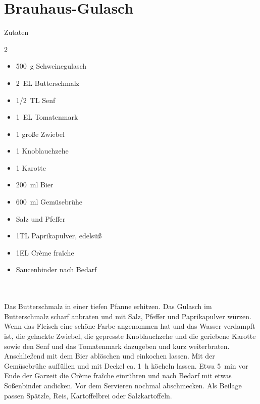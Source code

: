 \section*{Brauhaus-Gulasch}
\ihead{}\ohead{}
\cfoot{}
{\Large Zutaten}
\begin{multicols}{2}
\begin{itemize}
\item \SI{500}{g} Schweinegulasch
\item \SI{2}{EL} Butterschmalz
\item \SI{1/2}{TL} Senf
\item \SI{1}{EL} Tomatenmark
\item \num{1} große Zwiebel
\item \num{1} Knoblauchzehe
\item \num{1} Karotte
\item \SI{200}{ml} Bier
\item \SI{600}{ml} Gemüsebrühe
\item Salz und Pfeffer
\item \num{1}{TL} Paprikapulver, edelsüß
\item \num{1}{EL} Crème fraîche
\item Saucenbinder nach Bedarf
\end{itemize}
\end{multicols}
\\
\\
Das Butterschmalz in einer tiefen Pfanne erhitzen.
Das Gulasch im Butterschmalz scharf anbraten und mit Salz, Pfeffer und Paprikapulver würzen.
Wenn das Fleisch eine schöne Farbe angenommen hat und das Wasser verdampft ist, die gehackte Zwiebel, die gepresste Knoblauchzehe und die geriebene Karotte sowie den Senf und das Tomatenmark dazugeben und kurz weiterbraten.
Anschließend mit dem Bier ablöschen und einkochen lassen.
Mit der Gemüsebrühe auffüllen und mit Deckel ca. \SI{1}{h} köcheln lassen.
Etwa \SI{5}{min} vor Ende der Garzeit die Crème fraîche einrühren und nach Bedarf mit etwas Soßenbinder andicken.
Vor dem Servieren nochmal abschmecken.
Als Beilage passen Spätzle, Reis, Kartoffelbrei oder Salzkartoffeln.
